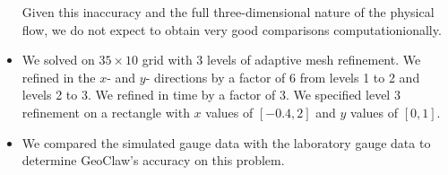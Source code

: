 \begin{itemize}
Given this inaccuracy and the full three-dimensional nature of the physical
flow, we do not expect to obtain very good comparisons computationionally.

\item We solved on $35\times 10$ grid with 3 levels of adaptive mesh refinement.
We refined in the $x$- and $y$- directions by a factor of 6 from levels 1 to 2 and
levels 2 to 3.  We refined in time by a factor of 3.  We specified level 3 refinement
on a rectangle with $x$ values of $[-0.4, 2]$ and $y$ values of $[0, 1]$.

\item We compared the simulated gauge data with the laboratory gauge data 
to determine GeoClaw's accuracy on this problem.
\end{itemize}

